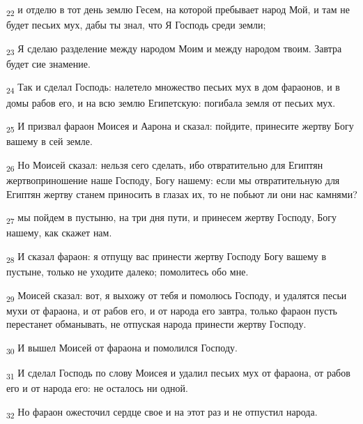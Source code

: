 \begin{tcolorbox}
\textsubscript{22} и отделю в тот день землю Гесем, на которой пребывает народ Мой, и там не будет песьих мух, дабы ты знал, что Я Господь среди земли;
\end{tcolorbox}
\begin{tcolorbox}
\textsubscript{23} Я сделаю разделение между народом Моим и между народом твоим. Завтра будет сие знамение.
\end{tcolorbox}
\begin{tcolorbox}
\textsubscript{24} Так и сделал Господь: налетело множество песьих мух в дом фараонов, и в домы рабов его, и на всю землю Египетскую: погибала земля от песьих мух.
\end{tcolorbox}
\begin{tcolorbox}
\textsubscript{25} И призвал фараон Моисея и Аарона и сказал: пойдите, принесите жертву Богу вашему в сей земле.
\end{tcolorbox}
\begin{tcolorbox}
\textsubscript{26} Но Моисей сказал: нельзя сего сделать, ибо отвратительно для Египтян жертвоприношение наше Господу, Богу нашему: если мы отвратительную для Египтян жертву станем приносить в глазах их, то не побьют ли они нас камнями?
\end{tcolorbox}
\begin{tcolorbox}
\textsubscript{27} мы пойдем в пустыню, на три дня пути, и принесем жертву Господу, Богу нашему, как скажет нам.
\end{tcolorbox}
\begin{tcolorbox}
\textsubscript{28} И сказал фараон: я отпущу вас принести жертву Господу Богу вашему в пустыне, только не уходите далеко; помолитесь обо мне.
\end{tcolorbox}
\begin{tcolorbox}
\textsubscript{29} Моисей сказал: вот, я выхожу от тебя и помолюсь Господу, и удалятся песьи мухи от фараона, и от рабов его, и от народа его завтра, только фараон пусть перестанет обманывать, не отпуская народа принести жертву Господу.
\end{tcolorbox}
\begin{tcolorbox}
\textsubscript{30} И вышел Моисей от фараона и помолился Господу.
\end{tcolorbox}
\begin{tcolorbox}
\textsubscript{31} И сделал Господь по слову Моисея и удалил песьих мух от фараона, от рабов его и от народа его: не осталось ни одной.
\end{tcolorbox}
\begin{tcolorbox}
\textsubscript{32} Но фараон ожесточил сердце свое и на этот раз и не отпустил народа.
\end{tcolorbox}
